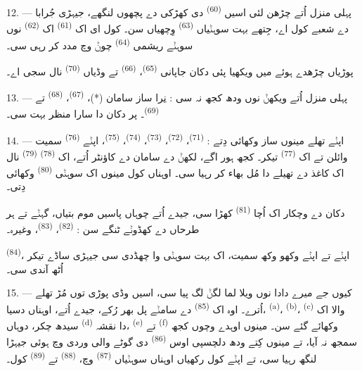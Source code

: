 12. --- پہلی منزل اُتے چڑھن لئی اسیں  \textsuperscript{(60)} دی
کھڑکی دے پچھوں لنگھے، جیہڑی جُرابا دے شعبے کول اے، جِتھے بہت سوہݨیاں 
\textsuperscript{(63)} وِچھیاں سن۔ کول ای اک 
\textsuperscript{(61)} اک  \textsuperscript{(62)} نوں سوہݨے ریشمی
 \textsuperscript{(64)} چوݨ وچ مدد کر رہی سی۔

پوڑیاں چڑھدے ہوئے میں ویکھیا پئی دکان جاپانی  \textsuperscript{(65)}،
 \textsuperscript{(66)} تے وڈیاں  \textsuperscript{(70)}
نال سجی اے۔

13. --- پہلی منزل اُتے ویکھݨ نوں ودھ کجھ نہ سی : نِرا ساز سامان (*)،
 \textsuperscript{(67)}، 
\textsuperscript{(68)} تے  \textsuperscript{(69)}۔ پر دکان دا سارا
منظر بہت  سی۔

14. --- اپݨے تھلے مینوں ساز وکھائی دِتے :  \textsuperscript{(71)}،
 \textsuperscript{(72)}،  \textsuperscript{(73)}،
 \textsuperscript{(74)}،  \textsuperscript{(75)}،
اپݨے  \textsuperscript{(76)} سمیت وائلن تے اک 
\textsuperscript{(77)} تیکر۔ کجھ ہور اگے، لکھݨ دے سامان دے کاؤنٹر اُتے، اک
 \textsuperscript{(78)}  \textsuperscript{(79)}
نال اک کاغذ دے تھیلے دا مُل بھاء کر رہیا سی۔ اوہناں کول مینوں اک سوہݨی
 \textsuperscript{(80)} وکھائی دِتی۔

دکان دے وچکار اک اُچا  \textsuperscript{(81)} کھڑا سی، جیدے
اُتے چوہاں پاسیں موم بتیاں، گہݨے تے ہر طرحاں دے کھڈوݨے ٹنگے سن :
 \textsuperscript{(82)}،  \textsuperscript{(83)}،
وغیرہ۔

 \textsuperscript{(84)}، اپݨے  تے اپݨے وکھو
وکھ  سمیت، اک بہت سوہݨی وا چھڈدی سی جیہڑی ساڈے تیکر اُٹھ آندی سی۔

\VUsaut{3.4mm}
\VUsaut{2.8mm}

15. --- کیوں جے میرے دادا نوں ویلا لما لگݨ لگ پیا سی، اسیں وڈی پوڑی توں مُڑ تھلے
اُترے۔ اوہ اک  \textsuperscript{(85)} دے سامݨے پل بھر رُکے،
جیدے اُتے، اوہناں دسیا،  \textsuperscript{(a)}،
 \textsuperscript{(b)}، 
\textsuperscript{(c)}  والا اک سیدھ چکر، دوہاں
 \textsuperscript{(d)} دا نقشہ،  \textsuperscript{(e)}
تے  \textsuperscript{(f)} وکھائے گئے سن۔ مینوں اوہدے وچوں کجھ سمجھ
نہ آیا، تے مینوں کِتے ودھ دلچسپی اوس  \textsuperscript{(86)}
دی گوٹے والی وردی وچ ہوئی جیہڑا لنگھ رہیا سی، تے اپݨے کول رکھیاں اوہناں سوہݨیاں
 \textsuperscript{(87)} وچ،  \textsuperscript{(88)} تے
 \textsuperscript{(89)} کول۔

